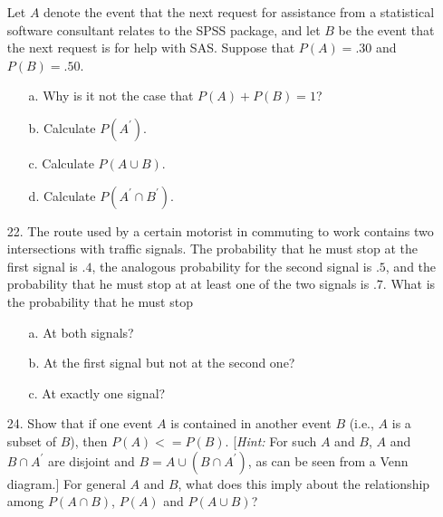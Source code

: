 \documentclass[letterpaper,12pt]{article}
\begin{document}
\begin{enumerate}
  Let $A$ denote the event that the next request for assistance from a statistical software consultant relates to the SPSS package, and let $B$ be the event that the next request is for help with SAS. Suppose that $P(A) = .30$ and $P(B) = .50$.
  \begin{enumerate}
      \item[a.]
        Why is it not the case that $P(A) + P(B) = 1$?
      \item[b.]
        Calculate $P(A^\prime)$.
      \item[c.]
        Calculate $P(A\cup B)$.
      \item[d.]
        Calculate $P(A^\prime \cap B^\prime)$.
    \end{enumerate}
  \item[22.]
    The route used by a certain motorist in commuting to work contains two intersections with traffic signals. The probability that he must stop at the first signal is $.4$, the analogous probability for the second signal is $.5$, and the probability that he must stop at at least one of the two signals is $.7$. What is the probability that he must stop
  \begin{enumerate}
      \item[a.]
        At both signals?
      \item[b.]
        At the first signal but not at the second one?
      \item[c.]
        At exactly one signal?
    \end{enumerate}
  \item[24.]
    Show that if one event $A$ is contained in another event $B$ (i.e., $A$ is a subset of $B$), then $P(A) <= P(B)$. [\textit{Hint:} For such $A$ and $B$, $A$ and $B \cap A^\prime$ are disjoint and $B = A \cup (B \cap A^\prime)$, as can be seen from a Venn diagram.] For general $A$ and $B$, what does this imply about the relationship among $P(A \cap B)$, $P(A)$ and $P(A \cup B)$?
\end{enumerate}
\end{document}
